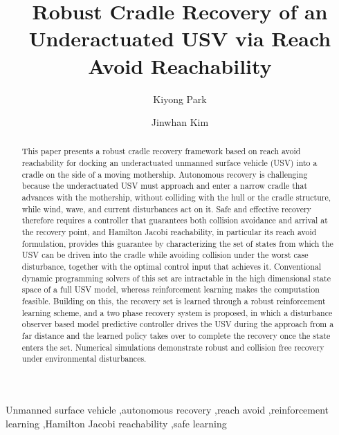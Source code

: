 \documentclass[5p,times,authoryear]{elsarticle}
\begin{document}
\begin{frontmatter}
\dochead{}

\title{Robust Cradle Recovery of an Underactuated USV via Reach Avoid Reachability}

\author{Kiyong Park}
\author{Jinwhan Kim}
\address{Department of Mechanical Engineering, Korea Advanced Institute of Science and Technology (KAIST), Daejeon 34141, Republic of Korea}

\begin{abstract}
This paper presents a robust cradle recovery framework based on reach avoid reachability for docking an underactuated unmanned surface vehicle (USV) into a cradle on the side of a moving mothership. Autonomous recovery is challenging because the underactuated USV must approach and enter a narrow cradle that advances with the mothership, without colliding with the hull or the cradle structure, while wind, wave, and current disturbances act on it. Safe and effective recovery therefore requires a controller that guarantees both collision avoidance and arrival at the recovery point, and Hamilton Jacobi reachability, in particular its reach avoid formulation, provides this guarantee by characterizing the set of states from which the USV can be driven into the cradle while avoiding collision under the worst case disturbance, together with the optimal control input that achieves it. Conventional dynamic programming solvers of this set are intractable in the high dimensional state space of a full USV model, whereas reinforcement learning makes the computation feasible. Building on this, the recovery set is learned through a robust reinforcement learning scheme, and a two phase recovery system is proposed, in which a disturbance observer based model predictive controller drives the USV during the approach from a far distance and the learned policy takes over to complete the recovery once the state enters the set. Numerical simulations demonstrate robust and collision free recovery under environmental disturbances.
\end{abstract}

\begin{keyword}
Unmanned surface vehicle \sep autonomous recovery \sep reach avoid \sep reinforcement learning \sep Hamilton Jacobi reachability \sep safe learning
\end{keyword}

\end{frontmatter}
\end{document}
